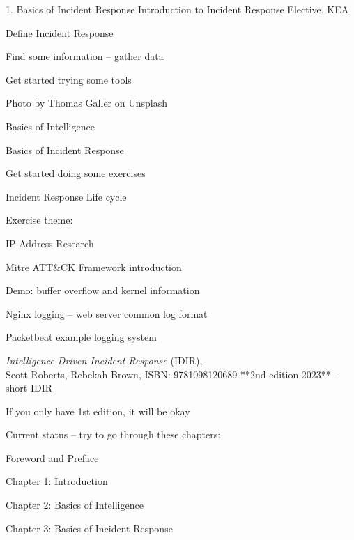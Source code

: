 \documentclass[Screen16to9,17pt]{foils}
\begin{document}
\mytitlepage
{1. Basics of Incident Response}
{Introduction to Incident Response Elective, KEA}




\begin{list2}
\item Define Incident Response
\item Find some information -- gather data
\item Get started trying  some tools
\end{list2}

{\hfill \small Photo by Thomas Galler on Unsplash}


\begin{list2}
\item Basics of Intelligence
\item Basics of Incident Response
\item Get started doing some exercises
\item Incident Response Life cycle
\end{list2}

Exercise theme:
\begin{list2}
\item IP Address Research
\item Mitre ATT\&CK Framework introduction
\item Demo: buffer overflow and kernel information
\item Nginx logging -- web server common log format
\item Packetbeat example logging system
\end{list2}


\emph{Intelligence-Driven Incident Response} (IDIR),\\
Scott Roberts, Rebekah Brown, ISBN: 9781098120689 **2nd edition 2023** - short IDIR

If you only have 1st edition, it will be okay

Current status -- try to go through these chapters:
\begin{list2}
\item Foreword and Preface
\item Chapter 1: Introduction
\item Chapter 2: Basics of Intelligence
\item Chapter 3: Basics of Incident Response
\end{list2}
\end{document}
